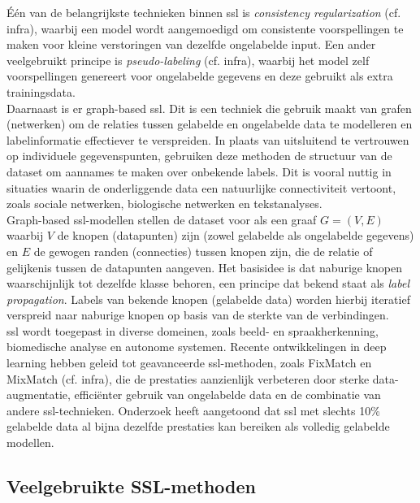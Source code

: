 Één van de belangrijkste technieken binnen \gls{ssl} is \emph{consistency regularization} (cf. infra), waarbij een model wordt aangemoedigd om consistente voorspellingen te maken voor kleine verstoringen van dezelfde ongelabelde input. \autocite{Fan_2022} Een ander veelgebruikt principe is \emph{pseudo-labeling} (cf. infra), waarbij het model zelf voorspellingen genereert voor ongelabelde gegevens en deze gebruikt als extra trainingsdata. \autocite{Lee_2013} \\

Daarnaast is er graph-based \gls{ssl}. Dit is een techniek die gebruik maakt van grafen (netwerken) om de relaties tussen gelabelde en ongelabelde data te modelleren en labelinformatie effectiever te verspreiden. In plaats van uitsluitend te vertrouwen op individuele gegevenspunten, gebruiken deze methoden de structuur van de dataset om aannames te maken over onbekende labels. Dit is vooral nuttig in situaties waarin de onderliggende data een natuurlijke connectiviteit vertoont, zoals sociale netwerken, biologische netwerken en tekstanalyses. \autocite{Song_2021} \\

Graph-based \gls{ssl}-modellen stellen de dataset voor als een graaf $G = (V, E)$ waarbij $V$ de knopen (datapunten) zijn (zowel gelabelde als ongelabelde gegevens) en $E$ de gewogen randen (connecties) tussen knopen zijn, die de relatie of gelijkenis tussen de datapunten aangeven. Het basisidee is dat naburige knopen waarschijnlijk tot dezelfde klasse behoren, een principe dat bekend staat als \emph{label propagation}. Labels van bekende knopen (gelabelde data) worden hierbij iteratief verspreid naar naburige knopen op basis van de sterkte van de verbindingen. \autocite{Zhu_2005} \\

\gls{ssl} wordt toegepast in diverse domeinen, zoals beeld- en spraakherkenning, biomedische analyse en autonome systemen. Recente ontwikkelingen in deep learning hebben geleid tot geavanceerde \gls{ssl}-methoden, zoals FixMatch en MixMatch (cf. infra), die de prestaties aanzienlijk verbeteren door sterke data-augmentatie, efficiënter gebruik van ongelabelde data en de combinatie van andere \gls{ssl}-technieken. Onderzoek heeft aangetoond dat \gls{ssl} met slechts 10\% gelabelde data al bijna dezelfde prestaties kan bereiken als volledig gelabelde modellen. \autocite{Lucas_2022}

\subsection{Veelgebruikte SSL-methoden}

